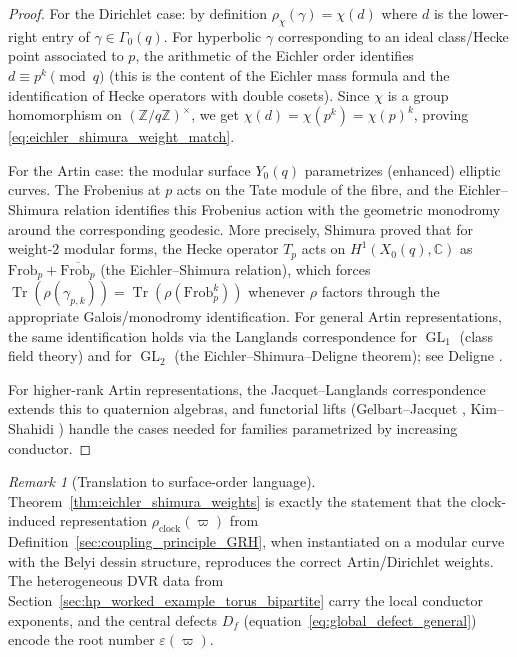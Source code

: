 \documentclass[11pt,oneside]{amsbook}
\numberwithin{equation}{section}
\theoremstyle{plain}
\theoremstyle{definition}
\theoremstyle{remark}
\newtheorem{remark}[theorem]{Remark}
\newcommand{\Z}{\mathbb{Z}}
\newcommand{\C}{\mathbb{C}}
\DeclareMathOperator{\Tr}{\mathrm{Tr}}
\DeclareMathOperator{\GL}{\mathrm{GL}}
\begin{document}
\begin{proof}
For the Dirichlet case: by definition $\rho_\chi(\gamma)=\chi(d)$ where $d$ is the lower-right entry of $\gamma\in\Gamma_0(q)$.
For hyperbolic $\gamma$ corresponding to an ideal class/Hecke point associated to $p$, the arithmetic of the Eichler order identifies $d\equiv p^k\pmod{q}$ (this is the content of the Eichler mass formula and the identification of Hecke operators with double cosets).
Since $\chi$ is a group homomorphism on $(\Z/q\Z)^\times$, we get $\chi(d)=\chi(p^k)=\chi(p)^k$, proving \eqref{eq:eichler_shimura_weight_match}.

For the Artin case: the modular surface $Y_0(q)$ parametrizes (enhanced) elliptic curves.
The Frobenius at $p$ acts on the Tate module of the fibre, and the Eichler--Shimura relation identifies this Frobenius action with the geometric monodromy around the corresponding geodesic.
More precisely, Shimura \cite{Shimura1971ArithmeticModularFunctions} proved that for weight-$2$ modular forms, the Hecke operator $T_p$ acts on $H^1(X_0(q),\C)$ as $\mathrm{Frob}_p+\overline{\mathrm{Frob}_p}$ (the Eichler--Shimura relation), which forces $\Tr(\rho(\gamma_{p,k}))=\Tr(\rho(\mathrm{Frob}_p^k))$ whenever $\rho$ factors through the appropriate Galois/monodromy identification.
For general Artin representations, the same identification holds via the Langlands correspondence for $\GL_1$ (class field theory) and for $\GL_2$ (the Eichler--Shimura--Deligne theorem); see Deligne \cite{Deligne1971FormeModulaires}.

For higher-rank Artin representations, the Jacquet--Langlands correspondence \cite{JacquetLanglands1970GL2} extends this to quaternion algebras, and functorial lifts (Gelbart--Jacquet \cite{GelbartJacquet1978GL3}, Kim--Shahidi \cite{KimShahidi2002GL4}) handle the cases needed for families parametrized by increasing conductor.
\end{proof}

\begin{remark}[Translation to surface-order language]
Theorem~\ref{thm:eichler_shimura_weights} is exactly the statement that the clock-induced representation $\rho_{\mathrm{clock}}(\varpi)$ from Definition~\ref{sec:coupling_principle_GRH}, when instantiated on a modular curve with the Belyi dessin structure, reproduces the correct Artin/Dirichlet weights.
The heterogeneous DVR data from Section~\ref{sec:hp_worked_example_torus_bipartite} carry the local conductor exponents, and the central defects $D_f$ (equation~\eqref{eq:global_defect_general}) encode the root number $\varepsilon(\varpi)$.
\end{remark}
\end{document}
